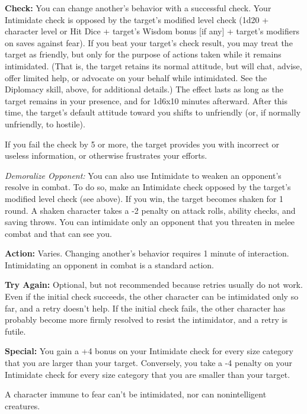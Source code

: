 
\textbf{Check:} You can change another's behavior with a successful check. Your Intimidate check is opposed by the target's modified level check (1d20 + character level or Hit Dice + target's Wisdom bonus [if any] + target's modifiers on saves against fear). If you beat your target's check result, you may treat the target as friendly, but only for the purpose of actions taken while it remains intimidated. (That is, the target retains its normal attitude, but will chat, advise, offer limited help, or advocate on your behalf while intimidated. See the Diplomacy skill, above, for additional details.) The effect lasts as long as the target remains in your presence, and for 1d6x10 minutes afterward. After this time, the target's default attitude toward you shifts to unfriendly (or, if normally unfriendly, to hostile).

If you fail the check by 5 or more, the target provides you with incorrect or useless information, or otherwise frustrates your efforts.

\textit{Demoralize Opponent:} You can also use Intimidate to weaken an opponent's resolve in combat. To do so, make an Intimidate check opposed by the target's modified level check (see above). If you win, the target becomes shaken for 1 round. A shaken character takes a -2 penalty on attack rolls, ability checks, and saving throws. You can intimidate only an opponent that you threaten in melee combat and that can see you.

\textbf{Action:} Varies. Changing another's behavior requires 1 minute of interaction. Intimidating an opponent in combat is a standard action.

\textbf{Try Again:} Optional, but not recommended because retries usually do not work. Even if the initial check succeeds, the other character can be intimidated only so far, and a retry doesn't help. If the initial check fails, the other character has probably become more firmly resolved to resist the intimidator, and a retry is futile.

\textbf{Special:} You gain a +4 bonus on your Intimidate check for every size category that you are larger than your target. Conversely, you take a -4 penalty on your Intimidate check for every size category that you are smaller than your target.

A character immune to fear can't be intimidated, nor can nonintelligent creatures.
